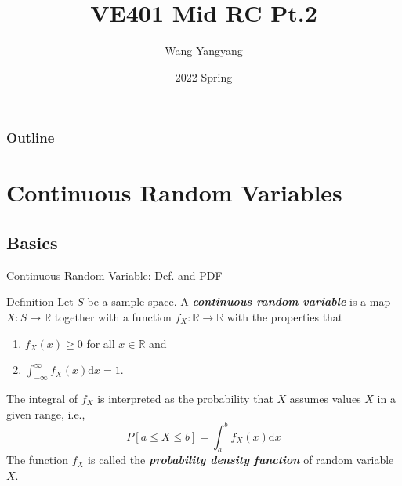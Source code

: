 \documentclass{beamer}
\title{VE401 Mid RC Pt.2}
\author{Wang Yangyang}
\date{2022 Spring}
\institute{UM-SJTU JI}
\newcommand{\bb}[1]{\textcolor{antiquefuchsia}{\textbf{\textit{#1}}}}
\begin{document}
\maketitle

\begin{frame}
\frametitle{Outline}
\tableofcontents
\end{frame}



\section{Continuous Random Variables}
\subsection{Basics}
\begin{frame}{Continuous Random Variable: Def. and PDF}
\begin{block}{Definition}
Let $S$ be a sample space. A \bb{continuous random variable} is a map $X: S \rightarrow \mathbb{R}$ together with a function $f_{X}: \mathbb{R} \rightarrow \mathbb{R}$ with the properties that
\begin{enumerate}
\item $f_{X}(x) \geq 0$ for all $x \in \mathbb{R}$ and
\item $\int_{-\infty}^{\infty} f_{X}(x) \mathrm{d} x=1$.
\end{enumerate}
The integral of $f_{X}$ is interpreted as the probability that $X$ assumes values $X$ in a given range, i.e.,
$$
P[a \leq X \leq b]=\int_{a}^{b} f_{X}(x) \mathrm{d} x
$$
The function $f_{X}$ is called the \bb{probability density function} of random variable $X$.
\end{block}
\end{frame}
\end{document}

